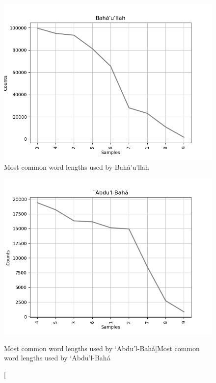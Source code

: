 \documentclass[12pt, oneside]{report}
\begin{document}
\begin{figure}[htb]
	\centering
	\includegraphics[width=15cm]{figures/word-length-bahaullah.png}
	\caption[Most common word lengths used by Bah\'{a}'u'llah]{Most common word lengths used by Bah\'{a}'u'llah}
	\label{fig:word-length-bahaullah}
\end{figure}
\begin{figure}[htb]
	\centering
	\includegraphics[width=15cm]{figures/word-length-abdulbaha.png}
	\caption[Most common word lengths used by `Abdu'l-Bah\'{a}]{Most common word lengths used by `Abdu'l-Bah\'{a}}
	\label{fig:word-length-abdulbaha}
\end{figure}
\end{document}

